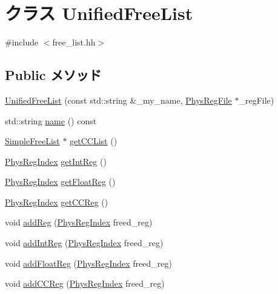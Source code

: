 \hypertarget{classUnifiedFreeList}{
\section{クラス UnifiedFreeList}
\label{classUnifiedFreeList}
}


{\ttfamily \#include $<$free\_\-list.hh$>$}\subsection*{Public メソッド}
\begin{DoxyCompactItemize}
\item 
\hyperlink{classUnifiedFreeList_a8ebdff68d322a016350547d0d1857cee}{UnifiedFreeList} (const std::string \&\_\-my\_\-name, \hyperlink{classPhysRegFile}{PhysRegFile} $\ast$\_\-regFile)
\item 
std::string \hyperlink{classUnifiedFreeList_a37627d5d5bba7f4a8690c71c2ab3cb07}{name} () const 
\item 
\hyperlink{classSimpleFreeList}{SimpleFreeList} $\ast$ \hyperlink{classUnifiedFreeList_a3832e036b3106722cadba456ac2e8921}{getCCList} ()
\item 
\hyperlink{o3_2comm_8hh_a5ec29599c4bc29a3054c451674969e7b}{PhysRegIndex} \hyperlink{classUnifiedFreeList_a716ff37969684e89443b573f87ed235a}{getIntReg} ()
\item 
\hyperlink{o3_2comm_8hh_a5ec29599c4bc29a3054c451674969e7b}{PhysRegIndex} \hyperlink{classUnifiedFreeList_a64f4baa8fe451eb2e016cb2115f18ce6}{getFloatReg} ()
\item 
\hyperlink{o3_2comm_8hh_a5ec29599c4bc29a3054c451674969e7b}{PhysRegIndex} \hyperlink{classUnifiedFreeList_ab34cd45ad8654ba4843984b09b7c0465}{getCCReg} ()
\item 
void \hyperlink{classUnifiedFreeList_a01fd4688f223ccaeef83b3adf2cb2acc}{addReg} (\hyperlink{o3_2comm_8hh_a5ec29599c4bc29a3054c451674969e7b}{PhysRegIndex} freed\_\-reg)
\item 
void \hyperlink{classUnifiedFreeList_afdfc8a96dd61086f602fdb1b099aee55}{addIntReg} (\hyperlink{o3_2comm_8hh_a5ec29599c4bc29a3054c451674969e7b}{PhysRegIndex} freed\_\-reg)
\item 
void \hyperlink{classUnifiedFreeList_a834c16ded33f7882b59ab88e6352b0a3}{addFloatReg} (\hyperlink{o3_2comm_8hh_a5ec29599c4bc29a3054c451674969e7b}{PhysRegIndex} freed\_\-reg)
\item 
void \hyperlink{classUnifiedFreeList_a0ef20ae376cb3c93b4cd8dd36ecb517b}{addCCReg} (\hyperlink{o3_2comm_8hh_a5ec29599c4bc29a3054c451674969e7b}{PhysRegIndex} freed\_\-reg)

\end{DoxyCompactItemize}
